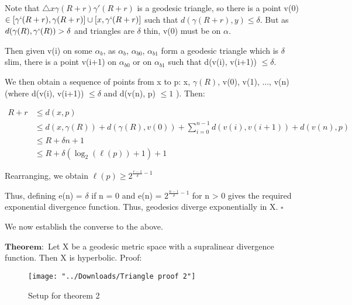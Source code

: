 \documentclass[11pt]{article}
\newcommand{\vs}{\vskip10pt}
\begin{document}
	Note that $\triangle x \gamma(R+r) \gamma'(R+r)$ is a geodesic triangle, so there is a point v(0) $\in [\gamma`(R+r), \gamma(R+r)] \cup [x, \gamma`(R+r)]$ such that $d(\gamma(R+r), y) \leq \delta$. But as $d(\gamma(R), \gamma`(R)) > \delta $ and triangles are $\delta$ thin, v(0) must be on $\alpha$. 
	
	Then given v(i) on some $\alpha_{b}$, as $\alpha_{b}$, $\alpha_{b0}$, $\alpha_{b1}$ form a geodesic triangle which is $\delta $ slim, there is a point v(i+1) on $\alpha_{b0}$ or on $\alpha_{b1}$ such that d(v(i), v(i+1)) $\leq \delta$. 
	
	We then obtain a sequence of points from x to p: x, $\gamma(R)$, v(0), v(1), ..., v(n) (where d(v(i), v(i+1)) $\leq \delta$ and d(v(n), p) $\leq 1$ ). Then: 
	 
	 \begin{align*}
	 R+r &\leq d(x, p) \\
	 &\leq d(x, \gamma(R)) + d(\gamma(R), v(0))+ \sum_{i=0}^{n-1} d(v(i), v(i+1)) + d(v(n), p) \\
	 &\leq R + \delta n + 1 \\
	 &\leq R + \delta (\log_2(\ell(p))+1) + 1
	 \end{align*}
	
	 Rearranging, we obtain $\ell(p) \geq 2^{\frac{r-1}{\delta} - 1}$
	 
	 Thus, defining e(n) = $\delta$ if n = 0 and e(n) = $2^{\frac{n-1}{\delta} - 1}$ for n > 0 gives the required exponential divergence function. Thus, geodesics diverge exponentially in X. 
	 $\square$
	  
	\vs 
	 
 	We now establish the converse to the above.
 	\vs
 	
 	$\mathbf{Theorem: }$ Let X be a geodesic metric space with a supralinear divergence function. Then X is hyperbolic. 
 	\vs
 	Proof: 
 	
 		\begin{figure}[h]
 		\centering
 		\texttt{[image: "../Downloads/Triangle proof 2"]}
 		\caption{Setup for theorem 2}
 		\label{Figure 2: Setup for theorem 2}
 		
 	\end{figure}
 	
\end{document}
